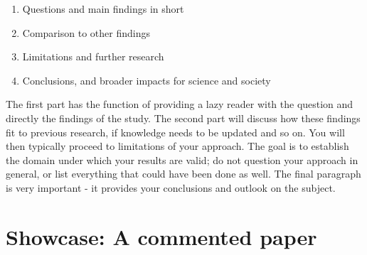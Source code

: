 \documentclass{tufte-book}
\begin{document}
\begin{enumerate}
\item Questions and main findings in short
\item Comparison to other findings
\item Limitations and further research
\item Conclusions, and broader impacts for science and society
\end{enumerate}

The first part has the function of providing a lazy reader with the question and directly the findings of the study. The second part will discuss how these findings fit to previous research, if knowledge needs to be updated and so on.  You will then typically proceed to limitations of your approach. The goal is to establish the domain under which your results are valid; do not question your approach in general, or list everything that could have been done as well. The final paragraph is very important - it provides your conclusions and outlook on the subject. 

\section{Showcase: A commented paper}
\end{document}
